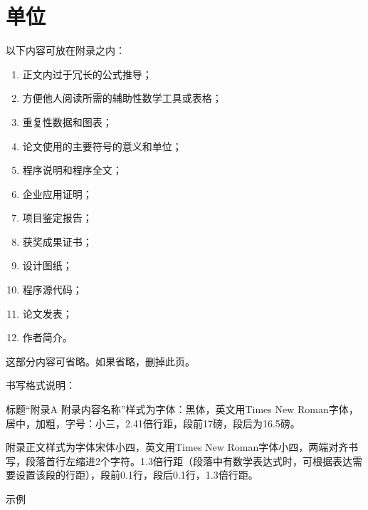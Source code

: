 \appendix

\chapter{单位}

以下内容可放在附录之内：
\begin{enumerate}[label={(\arabic*)},itemindent=2em,align=left,labelsep=0em]
\item 正文内过于冗长的公式推导；
\item 方便他人阅读所需的辅助性数学工具或表格；
\item 重复性数据和图表；
\item 论文使用的主要符号的意义和单位；
\item 程序说明和程序全文；
\item 企业应用证明；
\item 项目鉴定报告；
\item 获奖成果证书；
\item 设计图纸；
\item 程序源代码；
\item 论文发表；
\item 作者简介。
\end{enumerate}

这部分内容可省略。如果省略，删掉此页。

书写格式说明：

标题“附录A 附录内容名称”样式为字体：黑体，英文用Times New Roman字体，居中，加粗，字号：小三，2.41倍行距，段前17磅，段后为16.5磅。

附录正文样式为字体宋体小四，英文用Times New Roman字体小四，两端对齐书写，段落首行左缩进2个字符。1.3倍行距（段落中有数学表达式时，可根据表达需要设置该段的行距），段前0.1行，段后0.1行，1.3倍行距。


示例


